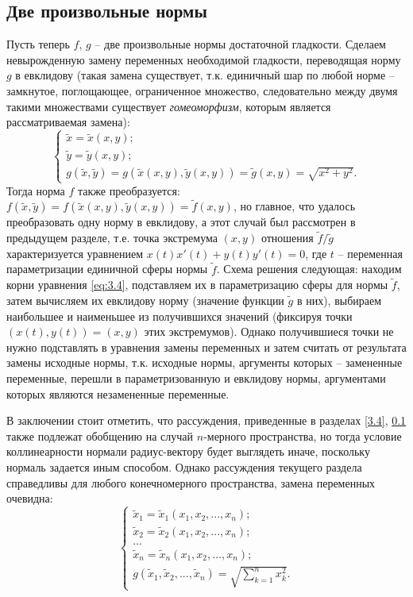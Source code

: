 \documentclass{article}
\begin{document}
\subsection{Две произвольные нормы} \label{3.5}
Пусть теперь $f, \, g$ -- две произвольные нормы достаточной гладкости. Сделаем невырожденную замену переменных необходимой гладкости, переводящая норму $g$ в евклидову (такая замена существует, т.к. единичный шар по любой норме -- замкнутое, поглощающее, ограниченное множество, следовательно между двумя такими множествами существует \textit{гомеоморфизм}, которым является рассматриваемая замена):
\begin{equation*}
	\begin{cases}
		\tilde{x} = \tilde{x}(x, y); \\
		\tilde{y} = \tilde{y}(x, y); \\
		g(\tilde{x}, \tilde{y}) = g(\tilde{x}(x,y), \tilde{y}(x,y)) = \tilde{g}(x,y) = \sqrt{x^2+y^2}.
	\end{cases}
\end{equation*}
Тогда норма $f$ также преобразуется: $f(\tilde{x}, \tilde{y}) = f(\tilde{x}(x,y), \tilde{y}(x,y)) = \tilde{f}(x,y)$, но главное, что удалось преобразовать одну норму в евклидову, а этот случай был рассмотрен в предыдущем разделе, т.е. точка экстремума $(x,y)$ отношения $\tilde{f}/\tilde{g}$ характеризуется уравнением
$x(t)x'(t) + y(t)y'(t) = 0$, где $t$ -- переменная параметризации единичной сферы нормы $ \tilde{f}$. Схема решения следующая: находим корни уравнения \eqref{eq:3.4}, подставляем их в параметризацию сферы для нормы $ \tilde{f}$, затем вычисляем их евклидову норму (значение функции $\tilde{g}$ в них), выбираем наибольшее и наименьшее из получившихся значений (фиксируя точки $(x(t),y(t)) = (x,y)$ этих экстремумов). Однако получившиеся точки не нужно подставлять в уравнения замены переменных и затем считать от результата замены исходные нормы, т.к. исходные нормы, аргументы которых -- замененные переменные, перешли в параметризованную и евклидову нормы, аргументами которых являются незамененные переменные.

\vspace{1mm}
В заключении стоит отметить, что рассуждения, приведенные в разделах \ref{3.4}, \ref{3.5} также подлежат обобщению на случай $n$-мерного пространства, но тогда условие коллинеарности нормали радиус-вектору будет выглядеть иначе, поскольку нормаль задается иным способом. Однако рассуждения текущего раздела справедливы для любого конечномерного пространства, замена переменных очевидна:
\begin{equation}\label{replace}
	\begin{cases}
		\tilde{x}_1 = \tilde{x}_1(x_1,x_2,...,x_n); \\
		\tilde{x}_2 = \tilde{x}_2(x_1,x_2,...,x_n); \\
		... \\
		\tilde{x}_n = \tilde{x}_n(x_1,x_2,...,x_n); \\
		g(\tilde{x}_1, \tilde{x}_2, ..., \tilde{x}_n) = \sqrt{\sum\limits_{k=1}^n{x_k^2}}.
	\end{cases}
\end{equation}
\end{document}
